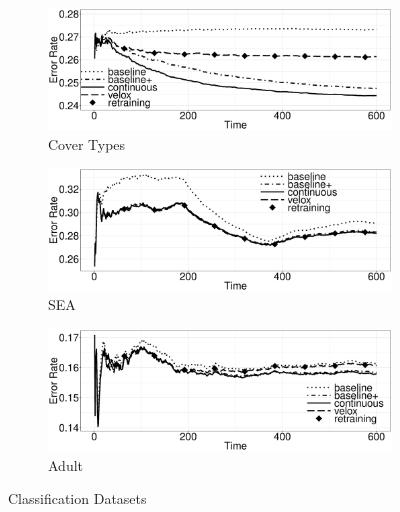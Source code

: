 \documentclass{vldb}
\begin{document}
\begin{figure}[h]
	\centering
\begin{subfigure}[b]{\columnwidth}
	\includegraphics[width=\columnwidth]{../images/experiment-results/cover-types-quality.eps}
	\caption{Cover Types}
	\label{fig:cover-types-quality}
\end{subfigure}
\begin{subfigure}[b]{\columnwidth}
  	\includegraphics[width=\columnwidth]{../images/experiment-results/sea-quality.eps}
	\caption{SEA}
	\label{fig:sea-quality}
\end{subfigure}
\begin{subfigure}[b]{\columnwidth}
  	\includegraphics[width=\columnwidth]{../images/experiment-results/adult-quality.eps}
	\caption{Adult}
	\label{fig:adult-quality}
\end{subfigure}
\vspace{2mm}
\caption{Classification Datasets }
\label{fig:local-classification-results}
\end{figure}
\end{document}
